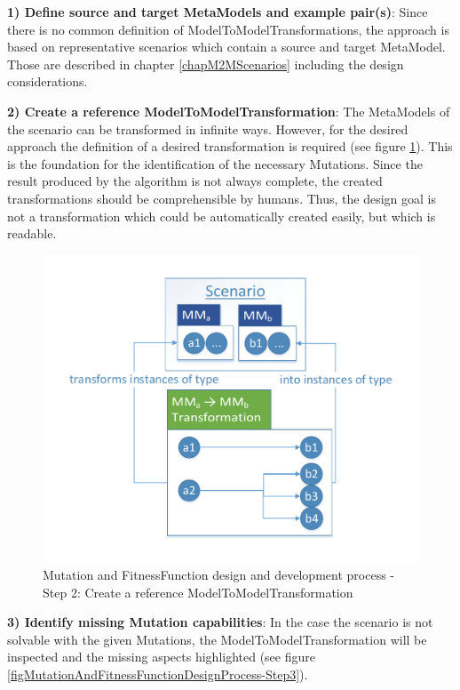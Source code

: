 \textbf{1) Define source and target \glspl{MetaModel} and example pair(s)}: Since there is no common definition of \glspl{ModelToModelTransformation}, the approach is based on representative scenarios which contain a source and target \gls{MetaModel}. Those are described in chapter \ref{chapM2MScenarios} including the design considerations.

\textbf{2) Create a reference \gls{ModelToModelTransformation}}: The \glspl{MetaModel} of the scenario can be transformed in infinite ways. However, for the desired approach the definition of a desired transformation is required (see figure \ref{figMutationAndFitnessFunctionDesignProcess-Step2}). This is the foundation for the identification of the necessary \glspl{Mutation}. Since the result produced by the algorithm is not always complete, the created transformations should be comprehensible by humans. Thus, the design goal is not a transformation which could be automatically created easily, but which is readable.

\begin{figure}[!ht]
	\centering
	\includegraphics[scale=0.5, trim=0cm 1cm 0cm 1cm, clip=true]{Images/MutationAndFitnessFunctionDesignProcess-Step2.pdf} 
	\caption{\Gls{Mutation} and \gls{FitnessFunction} design and development process - Step 2: Create a reference \gls{ModelToModelTransformation}}
	\label{figMutationAndFitnessFunctionDesignProcess-Step2}
\end{figure}


\textbf{3) Identify missing \gls{Mutation} capabilities}: In the case the scenario is not solvable with the given \glspl{Mutation}, the \gls{ModelToModelTransformation} will be inspected and the missing aspects highlighted (see figure \ref{figMutationAndFitnessFunctionDesignProcess-Step3}). 

